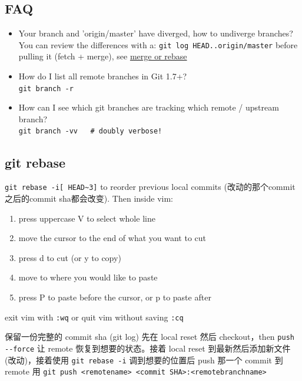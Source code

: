 \documentclass[a4paper, 12pt]{article}
\begin{document}
\subsection{FAQ}
\begin{itemize}
\item Your branch and 'origin/master' have diverged, how to undiverge branches?\\
You can review the differences with a: \verb|git log HEAD..origin/master| before pulling it (fetch + merge), see \href{https://stackoverflow.com/questions/2452226/master-branch-and-origin-master-have-diverged-how-to-undiverge-branches}{merge or rebase}

\item How do I list all remote branches in Git 1.7+?\\
\verb|git branch -r|

\item How can I see which git branches are tracking which remote / upstream branch?\\
\verb|git branch -vv   # doubly verbose!|

\end{itemize}

\subsection{git rebase}
\verb|git rebase -i[ HEAD~3]| to reorder previous local commits (改动的那个commit之后的commit sha都会改变). Then inside vim:
\begin{enumerate}
\item press uppercase V to select whole line
\item move the cursor to the end of what you want to cut
\item press d to cut (or y to copy)
\item move to where you would like to paste
\item press P to paste before the cursor, or p to paste after
\end{enumerate}

exit vim with \verb|:wq| or quit vim without saving \verb|:cq|

{\color{red}保留一份完整的 commit sha (git log)} 先在 local reset 然后 checkout，then \verb|push --force| 让 remote 恢复到想要的状态。接着 local reset 到最新然后添加新文件(改动)，接着使用 \verb|git rebase -i| 调到想要的位置后 push 那一个 commit 到 remote 用 \verb|git push <remotename> <commit SHA>:<remotebranchname>|
\end{document}
